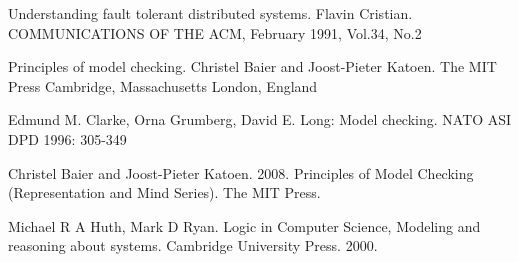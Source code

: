 \documentclass[titlepage, 12pt]{book}
\begin{document}
\begin{thebibliography}{99}
 Understanding fault tolerant distributed systems. Flavin Cristian. COMMUNICATIONS OF THE ACM, February 1991, Vol.34, No.2

 Principles of model checking. Christel Baier and Joost-Pieter Katoen. The MIT Press Cambridge, Massachusetts
London, England

 Edmund M. Clarke, Orna Grumberg, David E. Long: Model checking. NATO ASI DPD 1996: 305-349

 Christel Baier and Joost-Pieter Katoen. 2008. Principles of Model Checking (Representation and Mind Series). The MIT Press.

 Michael R A Huth, Mark D Ryan. Logic in Computer Science, Modeling and reasoning about systems. Cambridge University Press. 2000.

\end{thebibliography}

\end{document}
